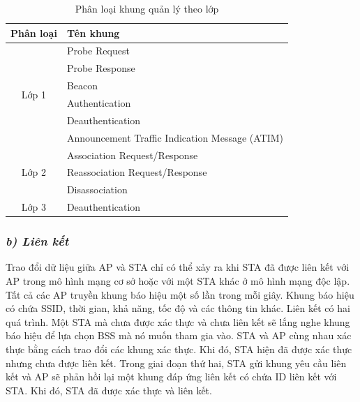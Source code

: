 \begin{table}[!htbp]
\centering
\small
\setlength{\extrarowheight}{1pt}
\caption{\label{tab:management-class}Phân loại khung quản lý theo lớp}
\begin{tabular}{|c|p{10cm}|}
\hline
\textbf{Phân loại}     & \textbf{Tên khung}                            \\ \hline
\multirow{6}{*}{Lớp 1} & Probe Request                                 \\ \cline{2-2} 
                       & Probe Response                                \\ \cline{2-2} 
                       & Beacon                                        \\ \cline{2-2} 
                       & Authentication                                \\ \cline{2-2} 
                       & Deauthentication                              \\ \cline{2-2} 
                       & Announcement Traffic Indication Message (ATIM) \\ \hline
\multirow{3}{*}{Lớp 2} & Association Request/Response                  \\ \cline{2-2} 
                       & Reassociation Request/Response                \\ \cline{2-2} 
                       & Disassociation                                \\ \hline
Lớp 3                  & Deauthentication                              \\ \hline
\end{tabular}
\end{table}

\subsubsection*{\textit{b) Liên kết}}

Trao đổi dữ liệu giữa AP và STA chỉ có thể xảy ra khi STA đã được liên kết với AP trong mô hình mạng cơ sở hoặc với một STA khác ở mô hình mạng độc lập. Tất cả các AP truyền khung báo hiệu một số lần trong mỗi giây. Khung báo hiệu có chứa SSID, thời gian, khả năng, tốc độ và các thông tin khác. Liên kết có hai quá trình. Một STA mà chưa được xác thực và chưa liên kết sẽ lắng nghe khung báo hiệu để lựa chọn BSS mà nó muốn tham gia vào. STA và AP cùng nhau xác thực bằng cách trao đổi các khung xác thực. Khi đó, STA hiện đã được xác thực nhưng chưa được liên kết. Trong giai đoạn thứ hai, STA gửi khung yêu cầu liên kết và AP sẽ phản hồi lại một khung đáp ứng liên kết có chứa ID liên kết với STA. Khi đó, STA đã được xác thực và liên kết.

